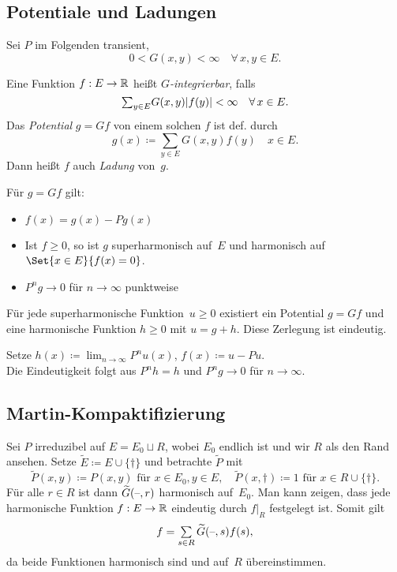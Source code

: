 \documentclass{cheat-sheet}
\begin{document}
\subsection{Potentiale und Ladungen}

Sei $P$ im Folgenden transient, \dh{}
\[
  0 < G(x, y) < \infty \quad
  \forall \, x, y \in E.
\]

\begin{defn}
  Eine Funktion $f : E \to \mathbb{R}$ heißt \emph{$G$-integrierbar}, falls
  \[
    {\sum}_{y \in E} G(x, y) \abs{f(y)} < \infty \quad
    \forall \, x \in E.
  \]
  Das \emph{Potential} $g = Gf$ von einem solchen $f$ ist def. durch
  \[
    g(x) \coloneqq {\sum}_{y \in E} G(x, y) f(y) \quad x \in E.
  \]
  Dann heißt $f$ auch \emph{Ladung} von~$g$.
\end{defn}

\begin{lem}
  Für $g = G f$ gilt:
  \begin{itemize}
    \item $f(x) = g(x) - P g(x)$
    \item Ist $f \geq 0$, so ist $g$ superharmonisch auf~$E$ und harmonisch auf $\Set{x \in E}{f(x) = 0}$.
    \item $P^n g \to 0$ für $n \to \infty$ punktweise
  \end{itemize}
\end{lem}

\begin{satz}
  Für jede superharmonische Funktion~$u \geq 0$ existiert ein Potential $g = G f$ und eine harmonische Funktion $h \geq 0$ mit $u = g + h$.
  Diese Zerlegung ist eindeutig.
\end{satz}

\begin{beweisidee}
  Setze $h(x) \coloneqq {\lim}_{n \to \infty} P^n u(x)$, \quad
  $f(x) \coloneqq u - P u$. \\
  Die Eindeutigkeit folgt aus $P^n h = h$ und $P^n g \to 0$ für $n \to \infty$.
\end{beweisidee}

\subsection{Martin-Kompaktifizierung}

\begin{bsp}
  Sei $P$ irreduzibel auf $E = E_0 \sqcup R$, wobei $E_0$ endlich ist und wir $R$ als den Rand ansehen.
  Setze $\widetilde{E} \coloneqq E \cup \{ \dagger \}$ und betrachte $\widetilde{P}$ mit
  \[
    \widetilde{P}(x, y) \coloneqq P(x, y) \text{ für } x \in E_0, y \in E, \quad
    \widetilde{P}(x, \dagger) \coloneqq 1 \text{ für } x \in R \cup \{ \dagger \}.
  \]
  Für alle $r \in R$ ist dann $\widetilde{G}(\text{--}, r)$ harmonisch auf~$E_0$.
  Man kann zeigen, dass jede harmonische Funktion $f : E \to \mathbb{R}$ eindeutig durch $f|_R$ festgelegt ist.
  Somit gilt
  \[
    f = \sum_{s \in R} \widetilde{G}(\blank, s) f(s),
  \]
  da beide Funktionen harmonisch sind und auf~$R$ übereinstimmen.
\end{bsp}
\end{document}
